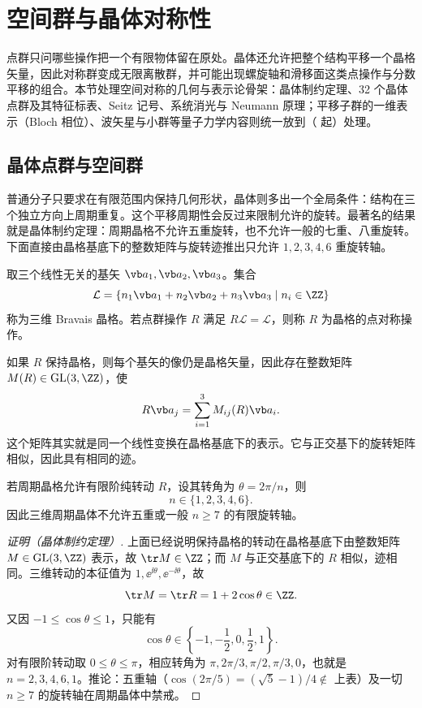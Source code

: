 \section{空间群与晶体对称性}
\label{sec:space-groups-bloch}

点群只问哪些操作把一个有限物体留在原处。晶体还允许把整个结构平移一个晶格矢量，因此对称群变成无限离散群，并可能出现螺旋轴和滑移面这类点操作与分数平移的组合。本节处理空间对称的几何与表示论骨架：晶体制约定理、32 个晶体点群及其特征标表、Seitz 记号、系统消光与 Neumann 原理；平移子群的一维表示（Bloch 相位）、波矢星与小群等量子力学内容则统一放到（ 起）处理。

\subsection{晶体点群与空间群}
\label{sec:crystallographic-point-space}

普通分子只要求在有限范围内保持几何形状，晶体则多出一个全局条件：结构在三个独立方向上周期重复。这个平移周期性会反过来限制允许的旋转。最著名的结果就是晶体制约定理：周期晶格不允许五重旋转，也不允许一般的七重、八重旋转。下面直接由晶格基底下的整数矩阵与旋转迹推出只允许 $1,2,3,4,6$ 重旋转轴。

\begin{definition}[Bravais 晶格]
取三个线性无关的基矢 $\vb a_1,\vb a_2,\vb a_3$。集合
\[
\mathcal L=
\left\{
 n_1\vb a_1+n_2\vb a_2+n_3\vb a_3
 \mid n_i\in\ZZ
\right\}
\]
称为三维 Bravais 晶格。若点群操作 $R$ 满足 $R\mathcal L=\mathcal L$，则称 $R$ 为晶格的点对称操作。
\label{def:bravais-lattice}
\end{definition}

如果 $R$ 保持晶格，则每个基矢的像仍是晶格矢量，因此存在整数矩阵 $M(R)\in\operatorname{GL}(3,\ZZ)$，使
\[
R\vb a_j=\sum_{i=1}^3 M_{ij}(R)\vb a_i.
\label{eq:lattice-integer-representation}
\]
这个矩阵其实就是同一个线性变换在晶格基底下的表示。它与正交基下的旋转矩阵相似，因此具有相同的迹。

\begin{theorem}[晶体制约定理]
若周期晶格允许有限阶纯转动 $R$，设其转角为 $\theta=2\pi/n$，则
\[
n\in\{1,2,3,4,6\}.
\]
因此三维周期晶体不允许五重或一般 $n\ge7$ 的有限旋转轴。
\label{thm:crystallographic-restriction}
\end{theorem}

\par\medskip
\begin{proof}[证明（晶体制约定理）]
上面已经说明保持晶格的转动在晶格基底下由整数矩阵 $M\in\operatorname{GL}(3,\ZZ)$ 表示，故 $\tr M\in\ZZ$；而 $M$ 与正交基底下的 $R$ 相似，迹相同。三维转动的本征值为 $1,\ee^{\ii\theta},\ee^{-\ii\theta}$，故
\[
\tr M=\tr R=1+2\cos\theta\in\ZZ.
\]
又因 $-1\leq\cos\theta\leq1$，只能有
\[
\cos\theta\in\left\{-1,-\frac12,0,\frac12,1\right\}.
\]
对有限阶转动取 $0\leq\theta\leq\pi$，相应转角为 $\pi,2\pi/3,\pi/2,\pi/3,0$，也就是 $n=2,3,4,6,1$。推论：五重轴（$\cos(2\pi/5)=(\sqrt5-1)/4\notin$ 上表）及一切 $n\ge7$ 的旋转轴在周期晶体中禁戒。
\end{proof}\par\medskip

